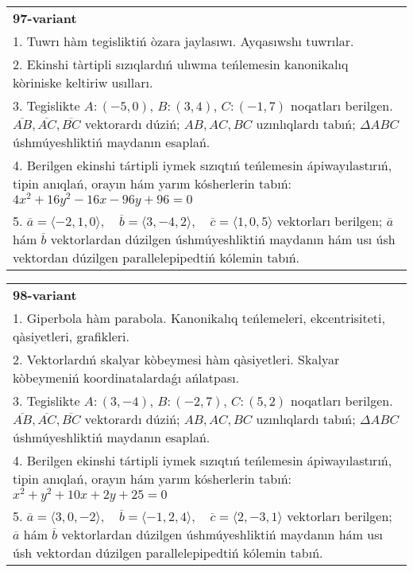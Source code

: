 \documentclass{article}
\begin{document}
\begin{tabular}{m{17cm}}
\textbf{97-variant}\\
1. Tuwrı hàm tegisliktiń òzara jaylasıwı. Ayqasıwshı tuwrılar.\\

2. Ekinshi tàrtipli sızıqlardıń ulıwma teńlemesin kanonikalıq kòriniske keltiriw usılları.\\

3. Tegislikte $A: (-5, 0)$, $B: (3, 4)$, $C: (-1, 7)$ noqatları berilgen. $\overline{AB}, \overline{AC}, \overline{BC}$ vektorardı dúziń; $AB, AC, BC$ uzınlıqlardı tabıń; $\Delta ABC$ úshmúyeshliktiń maydanın esaplań. \\

4. Berilgen ekinshi tártipli iymek sızıqtıń teńlemesin ápiwayılastırıń, tipin anıqlań, orayın hám yarım kósherlerin tabıń: $4x^2+16y^2-16x-96y+96=0$\\

5. \(\overline{a} = \langle -2, 1, 0 \rangle, \quad \overline{b} = \langle 3, -4, 2 \rangle, \quad \overline{c} = \langle 1, 0, 5 \rangle\) vektorları berilgen; \(\overline{a}\) hám \(\overline{b}\) vektorlardan dúzilgen úshmúyeshliktiń maydanın hám usı úsh vektordan dúzilgen parallelepipedtiń kólemin tabıń.
\end{tabular}
\vspace{1cm}


\begin{tabular}{m{17cm}}
\textbf{98-variant}\\
1. Giperbola hàm parabola. Kanonikalıq teńlemeleri, ekcentrisiteti, qàsiyetleri, grafikleri.\\

2. Vektorlardıń skalyar kòbeymesi hàm qàsiyetleri. Skalyar kòbeymeniń koordinatalardaǵı ańlatpası.\\

3. Tegislikte $A: (3, -4)$, $B: (-2, 7)$, $C: (5, 2)$ noqatları berilgen. $\overline{AB}, \overline{AC}, \overline{BC}$ vektorardı dúziń; $AB, AC, BC$ uzınlıqlardı tabıń; $\Delta ABC$ úshmúyeshliktiń maydanın esaplań. \\

4. Berilgen ekinshi tártipli iymek sızıqtıń teńlemesin ápiwayılastırıń, tipin anıqlań, orayın hám yarım kósherlerin tabıń: $x^2+y^2+10x+2y+25=0$\\

5. \(\overline{a} = \langle 3, 0, -2 \rangle, \quad \overline{b} = \langle -1, 2, 4 \rangle, \quad \overline{c} = \langle 2, -3, 1 \rangle\) vektorları berilgen; \(\overline{a}\) hám \(\overline{b}\) vektorlardan dúzilgen úshmúyeshliktiń maydanın hám usı úsh vektordan dúzilgen parallelepipedtiń kólemin tabıń.
\end{tabular}
\vspace{1cm}
\end{document}
